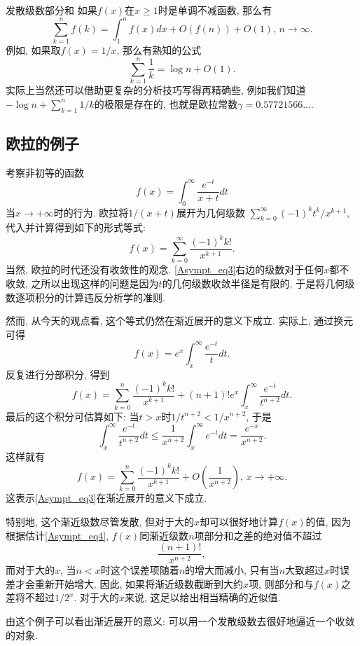 \begin{example}{发散级数部分和}
如果$f(x)$在$x\geq1$时是单调不减函数, 那么有$$
\sum_{k=1}^nf(k)=\int_1^n f(x)dx+O(f(n))+O(1),\,n\to\infty.
$$
例如, 如果取$f(x)=1/x$, 那么有熟知的公式
$$
\sum_{k=1}^n\frac{1}{k}=\log n+O(1).
$$
实际上当然还可以借助更复杂的分析技巧写得再精确些, 例如我们知道$-\log n+\sum_{k=1}^n1/k$的极限是存在的, 也就是欧拉常数$\gamma=0.57721566...$.
\end{example}

\subsection{欧拉的例子}
考察非初等的函数
$$
f(x)=\int_0^\infty\frac{e^{-t}}{x+t}dt
$$
当$x\to+\infty$时的行为. 欧拉将$1/(x+t)$展开为几何级数
$
\sum_{k=0}^\infty {(-1)^kt^k}/{x^{k+1}},
$
代入并计算得到如下的形式等式:
\begin{equation}\label{Asympt_eq3}
f(x)=\sum_{k=0}^\infty\frac{(-1)^kk!}{x^{k+1}}.
\end{equation}
当然, 欧拉的时代还没有收敛性的观念. \autoref{Asympt_eq3}右边的级数对于任何$x$都不收敛, 之所以出现这样的问题是因为$t$的几何级数收敛半径是有限的, 于是将几何级数逐项积分的计算违反分析学的准则. 

然而, 从今天的观点看, 这个等式仍然在渐近展开的意义下成立. 实际上, 通过换元可得
$$
f(x)=e^{x}\int_x^\infty \frac{e^{-t}}{t}dt.
$$
反复进行分部积分, 得到
$$
f(x)=\sum_{k=0}^n\frac{(-1)^kk!}{x^{k+1}}
+(n+1)!e^x\int_x^\infty\frac{e^{-t}}{t^{n+2}}dt.
$$
最后的这个积分可估算如下: 当$t>x$时$1/t^{n+2}<1/x^{n+2}$, 于是
\begin{equation}\label{Asympt_eq4}
\int_x^\infty\frac{e^{-t}}{t^{n+2}}dt
\leq\frac{1}{x^{n+2}}\int_x^\infty e^{-t}dt
=\frac{e^{-x}}{x^{n+2}}.
\end{equation}
这样就有
$$
f(x)=\sum_{k=0}^n\frac{(-1)^kk!}{x^{k+1}}
+O\left(\frac{1}{x^{n+2}}\right),\,x\to+\infty.
$$
这表示\autoref{Asympt_eq3}在渐近展开的意义下成立. 

特别地, 这个渐近级数尽管发散, 但对于大的$x$却可以很好地计算$f(x)$的值, 因为根据估计\autoref{Asympt_eq4}, $f(x)$同渐近级数$n$项部分和之差的绝对值不超过
$$
\frac{(n+1)!}{x^{n+2}},
$$
而对于大的$x$, 当$n<x$时这个误差项随着$n$的增大而减小, 只有当$n$大致超过$x$时误差才会重新开始增大. 因此, 如果将渐近级数截断到大约$x$项, 则部分和与$f(x)$之差将不超过$1/2^x$. 对于大的$x$来说, 这足以给出相当精确的近似值. 

由这个例子可以看出渐近展开的意义: 可以用一个发散级数去很好地逼近一个收敛的对象.
